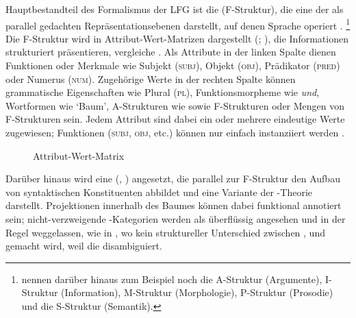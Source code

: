 Hauptbestandteil des Formalismus der LFG ist die 
(F-Struktur), die eine der als parallel gedachten Repräsentationsebenen
darstellt, auf denen Sprache operiert \autocite[840--844]{buttking2015}.%
%
	\footnote{\citet[862--865]{buttking2015} nennen darüber hinaus zum Beispiel
		noch die
		A-Struktur (Argumente),
		I-Struktur (Information),
		M-Struktur (Morphologie),
		P-Struktur (Prosodie)
		und die
		S-Struktur (Semantik).
	}
%
Die F-Struktur wird in
Attribut-Wert-Matrizen dargestellt
(;
\cites[vgl.][44--45]{bresnanetal2016}[207--221]{mueller2023}), die
Informationen strukturiert präsentieren, vergleiche . Als
Attribute in der linken Spalte dienen Funktionen oder
Merkmale wie Subjekt (\textsc{subj}), Objekt
(\textsc{obj}), Prädikator (\textsc{pred}) oder Numerus (\textsc{num}).
Zugehörige Werte in der rechten Spalte können grammatische Eigenschaften wie
Plural (\textsc{pl}), Funktionsmorpheme wie \textit{und}, Wortformen wie
`Baum', A-Strukturen wie  sowie F-Strukturen oder Mengen von F-Struk\-turen sein. Jedem
Attribut sind dabei ein oder mehrere eindeutige Werte zugewiesen; Funktionen
(\textsc{subj}, \textsc{obj}, etc.) können nur einfach instanziiert werden
\autocite[vgl.][44--58]{bresnanetal2016}.

\begin{figure}
\centering
	{%
	}
\caption{Attribut-Wert-Matrix \autocite[nach][209]{mueller2023}}
\label{fig:avm}
\end{figure}

Darüber hinaus wird eine  (, ) angesetzt, die parallel zur
F-Struktur den Aufbau von syntaktischen Konstituenten
abbildet und eine Variante der -Theorie
\autocites{chomsky1970,jackendoff1977} darstellt. Projektionen innerhalb des
Baumes können dabei funktional annotiert sein; nicht-verzweigende
-Kategorien werden als überflüssig angesehen und in der Regel
weggelassen, wie in , wo kein struktureller Unterschied
zwischen ,  und  gemacht wird,
weil die  disambiguiert.

